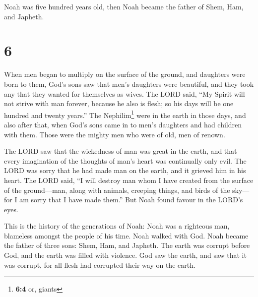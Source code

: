  Noah was five hundred years old, then Noah became the
father of Shem, Ham, and Japheth.

\hypertarget{section-5}{%
\section{6}\label{section-5}}

 When men began to multiply on the surface of the ground,
and daughters were born to them,  God's sons saw that
men's daughters were beautiful, and they took any that they wanted for
themselves as wives.  The LORD said, ``My Spirit will not
strive with man forever, because he also is flesh; so his days will be
one hundred and twenty years.''  The Nephilim\footnote{\textbf{6:4}
  or, giants} were in the earth in those days, and also after that, when
God's sons came in to men's daughters and had children with them. Those
were the mighty men who were of old, men of renown.

 The LORD saw that the wickedness of man was great in the
earth, and that every imagination of the thoughts of man's heart was
continually only evil.  The LORD was sorry that he had
made man on the earth, and it grieved him in his heart. 
The LORD said, ``I will destroy man whom I have created from the surface
of the ground---man, along with animals, creeping things, and birds of
the sky---for I am sorry that I have made them.''  But
Noah found favour in the LORD's eyes.

 This is the history of the generations of Noah: Noah was
a righteous man, blameless amongst the people of his time. Noah walked
with God.  Noah became the father of three sons: Shem,
Ham, and Japheth.  The earth was corrupt before God, and
the earth was filled with violence.  God saw the earth,
and saw that it was corrupt, for all flesh had corrupted their way on
the earth.

